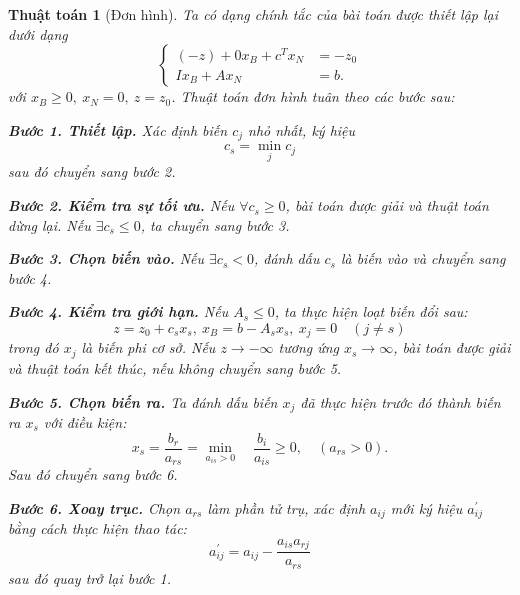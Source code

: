 \documentclass[12pt,a4paper]{report}
\newtheorem{ttoan}{Thuật toán}
\begin{document}
\begin{ttoan}[Đơn hình]
\setlength{\parindent}{4em}
Ta có dạng chính tắc của bài toán được thiết lập lại dưới dạng
\begin{equation}
\left\{\begin{split}
(-z) + 0x_B + c^Tx_N &= -z_0 \\
Ix_B + Ax_N &= b.
\end{split}\right.
\end{equation}
với $x_B \geq 0, \: x_N=0, \: z=z_0$. Thuật toán đơn hình tuân theo các bước sau:

\noindent \textbf{Bước 1. Thiết lập.}
Xác định biến $c_j$ nhỏ nhất, ký hiệu
\begin{equation}
c_s = \underset{j}{\min} c_j
\end{equation}
sau đó chuyển sang bước 2.

\noindent \textbf{Bước 2. Kiểm tra sự tối ưu.}
Nếu $\forall c_s \geq 0$, bài toán được giải và thuật toán dừng lại. Nếu $\exists c_s \leq 0$, ta chuyển sang bước 3. 

\noindent \textbf{Bước 3. Chọn biến vào.}
Nếu $\exists c_s < 0$, đánh dấu $c_s$ là biến vào và chuyển sang bước 4.

\noindent \textbf{Bước 4. Kiểm tra giới hạn.}
Nếu $A_s \leq 0$, ta thực hiện loạt biến đổi sau:
\begin{equation}
z=z_0+c_sx_s, \: x_B = b - A_sx_s, \: x_j=0 \quad (j\neq s)
\end{equation}
trong đó $x_j$ là biến phi cơ sở. Nếu $z \rightarrow -\infty $ tương ứng $x_s \rightarrow \infty$, bài toán được giải và thuật toán kết thúc, nếu không chuyển sang bước 5.

\noindent \textbf{Bước 5. Chọn biến ra.}
Ta đánh dấu biến $x_j$ đã thực hiện trước đó thành biến ra $x_s$ với điều kiện:
\begin{equation}
x_s = \frac{b_r}{a_{rs}} = \underset{a_{is}>0}{\min} \quad \frac{b_i}{a_{is}} \geq 0, \quad (a_{rs}>0).
\end{equation}
Sau đó chuyển sang bước 6.

\noindent \textbf{Bước 6. Xoay trục.}
Chọn $a_{rs}$ làm phần tử trụ, xác định $a_{ij}$ mới ký hiệu $a_{ij}^{'}$ bằng cách thực hiện thao tác:
\begin{equation}
a_{ij}^{'} = a_{ij} - \frac{a_{is}a_{rj}}{a_{rs}}
\end{equation}
sau đó quay trở lại bước 1.
\end{ttoan}
\end{document}
